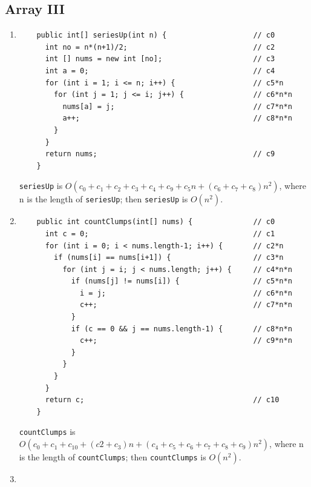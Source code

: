 \documentclass[a4paper,12pt]{article}
\begin{document}
  \subsection{Array III}
  \begin{enumerate}
    \item \begin{Verbatim}
    public int[] seriesUp(int n) {                    // c0
      int no = n*(n+1)/2;                             // c2
      int [] nums = new int [no];                     // c3
      int a = 0;                                      // c4
      for (int i = 1; i <= n; i++) {                  // c5*n
        for (int j = 1; j <= i; j++) {                // c6*n*n
          nums[a] = j;                                // c7*n*n
          a++;                                        // c8*n*n
        }
      }
      return nums;                                    // c9
    }
    \end{Verbatim}
    \texttt{seriesUp} is $O(c_0+c_1+c_2+c_3+c_4+c_9+c_5n+(c_6+c_7+c_8)n^2)$, where n is the length of \texttt{seriesUp};
    then \texttt{seriesUp} is $O(n^2)$.

    \item\begin{Verbatim}
    public int countClumps(int[] nums) {              // c0
      int c = 0;                                      // c1
      for (int i = 0; i < nums.length-1; i++) {       // c2*n
        if (nums[i] == nums[i+1]) {                   // c3*n
          for (int j = i; j < nums.length; j++) {     // c4*n*n
            if (nums[j] != nums[i]) {                 // c5*n*n
              i = j;                                  // c6*n*n
              c++;                                    // c7*n*n
            }
            if (c == 0 && j == nums.length-1) {       // c8*n*n
              c++;                                    // c9*n*n
            }
          }
        }
      }
      return c;                                       // c10
    }
    \end{Verbatim}
    \texttt{countClumps} is $O(c_0+c_1+c_10+(c2+c_3)n+(c_4+c_5+c_6+c_7+c_8+c_9)n^2)$, where n is the length of \texttt{countClumps};
    then \texttt{countClumps} is $O(n^2)$.
    \item \begin{Verbatim}


\end{Verbatim}
\end{enumerate}
\end{document}
